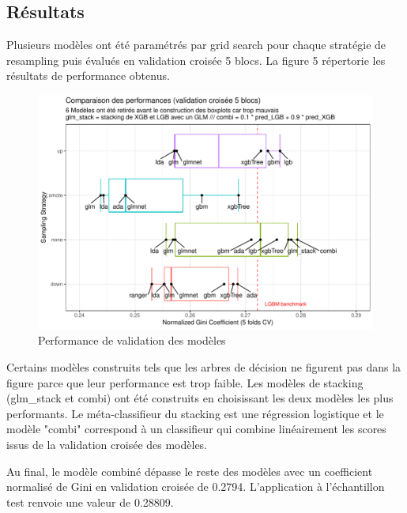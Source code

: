 \documentclass[french]{article}
\begin{document}
\begin{multicols}{2}
\section{Résultats}

Plusieurs modèles ont été paramétrés par grid search pour chaque stratégie de resampling puis évalués en validation croisée 5 blocs. La figure 5 répertorie les résultats de performance obtenus.

\begin{figure}[H] \centering
  \includegraphics[width = \columnwidth]{img/results}
  \caption{Performance de validation des modèles}
\end{figure}

Certains modèles construits tels que les arbres de décision ne figurent pas dans la figure parce que leur performance est trop faible. Les modèles de stacking (glm\_stack et combi) ont été construits en choisissant les deux modèles les plus performants. Le méta-classifieur du stacking est une régression logistique et le modèle "combi" correspond à un classifieur qui combine linéairement les scores issus de la validation croisée des modèles.

Au final, le modèle combiné dépasse le reste des modèles avec un coefficient normalisé de Gini en validation croisée de 0.2794. L'application à l'échantillon test renvoie une valeur de 0.28809.


\nocite{*}



\end{multicols}
\end{document}
